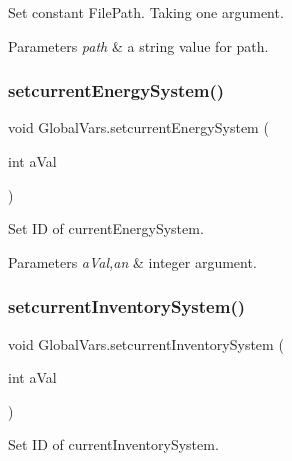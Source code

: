 Set constant File\+Path. Taking one argument. 


\begin{DoxyParams}{Parameters}
{\em path} & a string value for path. \\
\hline
\end{DoxyParams}
\mbox{\label{class_global_vars_a229e718d65ea9774c2991d516dcb67b0}} 
\subsubsection{\texorpdfstring{setcurrentEnergySystem()}{setcurrentEnergySystem()}}
{\footnotesize\ttfamily void Global\+Vars.\+setcurrent\+Energy\+System (\begin{DoxyParamCaption}\item[{int}]{a\+Val }\end{DoxyParamCaption})\hspace{0.3cm}{\ttfamily [inline]}}



Set ID of current\+Energy\+System. 


\begin{DoxyParams}{Parameters}
{\em a\+Val,an} & integer argument. \\
\hline
\end{DoxyParams}
\mbox{\label{class_global_vars_a7aae0cfed8bbdf1ed6e57dbc3543ac7f}} 
\subsubsection{\texorpdfstring{setcurrentInventorySystem()}{setcurrentInventorySystem()}}
{\footnotesize\ttfamily void Global\+Vars.\+setcurrent\+Inventory\+System (\begin{DoxyParamCaption}\item[{int}]{a\+Val }\end{DoxyParamCaption})\hspace{0.3cm}{\ttfamily [inline]}}



Set ID of current\+Inventory\+System. 


